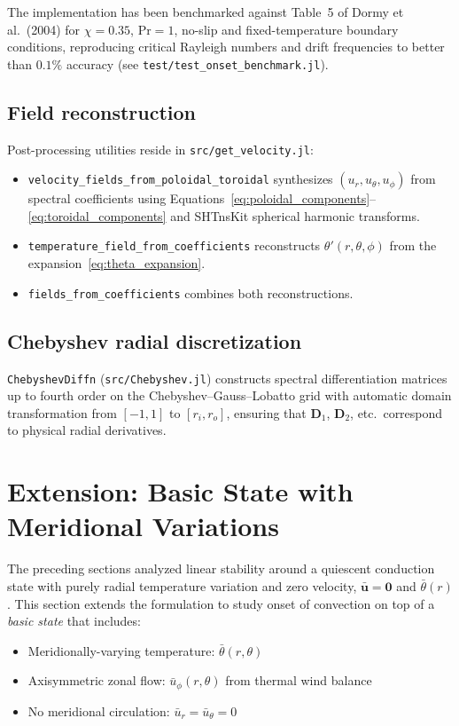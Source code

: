 \documentclass[11pt]{article}
\numberwithin{equation}{section}
\begin{document}
The implementation has been benchmarked against Table~5 of Dormy et al.~(2004) for $\chi=0.35$, $\mathrm{Pr}=1$, no-slip and fixed-temperature boundary conditions, reproducing critical Rayleigh numbers and drift frequencies to better than $0.1\%$ accuracy (see \texttt{test/test\_onset\_benchmark.jl}).

\subsection{Field reconstruction}
Post-processing utilities reside in \texttt{src/get\_velocity.jl}:
\begin{itemize}
  \item \texttt{velocity\_fields\_from\_poloidal\_toroidal} synthesizes $(u_r, u_\theta, u_\phi)$ from spectral coefficients using Equations~\eqref{eq:poloidal_components}--\eqref{eq:toroidal_components} and SHTnsKit spherical harmonic transforms.

  \item \texttt{temperature\_field\_from\_coefficients} reconstructs $\theta'(r,\theta,\phi)$ from the expansion~\eqref{eq:theta_expansion}.

  \item \texttt{fields\_from\_coefficients} combines both reconstructions.
\end{itemize}

\subsection{Chebyshev radial discretization}
\texttt{ChebyshevDiffn} (\texttt{src/Chebyshev.jl}) constructs spectral differentiation matrices up to fourth order on the Chebyshev--Gauss--Lobatto grid with automatic domain transformation from $[-1,1]$ to $[r_i,r_o]$, ensuring that $\bm{D}_1$, $\bm{D}_2$, etc.\ correspond to physical radial derivatives.

\section{Extension: Basic State with Meridional Variations}
\label{sec:basic_state}

The preceding sections analyzed linear stability around a quiescent conduction state with purely radial temperature variation and zero velocity, $\bar{\bm{u}} = \bm{0}$ and $\bar{\theta}(r)$. This section extends the formulation to study onset of convection on top of a \emph{basic state} that includes:
\begin{itemize}
  \item Meridionally-varying temperature: $\bar{\theta}(r,\theta)$
  \item Axisymmetric zonal flow: $\bar{u}_\phi(r,\theta)$ from thermal wind balance
  \item No meridional circulation: $\bar{u}_r = \bar{u}_\theta = 0$
\end{itemize}
\end{document}
